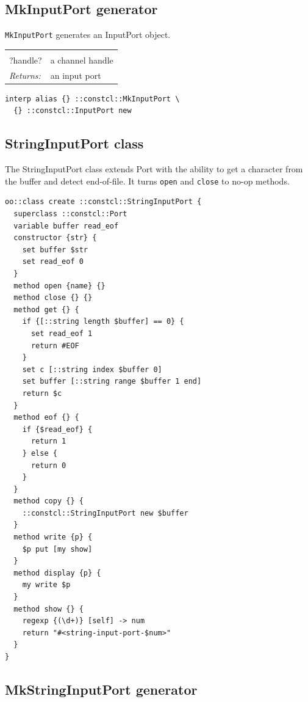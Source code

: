 \documentclass[twoside]{report}
\begin{document}
\subsection{MkInputPort generator}
\label{mkinputport-generator}

\texttt{MkInputPort} generates an InputPort object.

\noindent\begin{tabular}{ |p{1.9cm} p{8cm}| }
\hline
\rowcolor[HTML]{CCCCCC} \multicolumn{2}{|l|}{\bf MkInputPort (internal)} \\
?handle? & a channel handle \\
\textit{Returns:} & an input port \\
\hline
\end{tabular}

\begin{lstlisting}
interp alias {} ::constcl::MkInputPort \
  {} ::constcl::InputPort new
\end{lstlisting}

\subsection{StringInputPort class}
\label{stringinputport-class}

The StringInputPort class extends Port with the ability to get a character from the buffer and detect end-of-file. It turns \texttt{open} and \texttt{close} to no-op methods.

\begin{lstlisting}
oo::class create ::constcl::StringInputPort {
  superclass ::constcl::Port
  variable buffer read_eof
  constructor {str} {
    set buffer $str
    set read_eof 0
  }
  method open {name} {}
  method close {} {}
  method get {} {
    if {[::string length $buffer] == 0} {
      set read_eof 1
      return #EOF
    }
    set c [::string index $buffer 0]
    set buffer [::string range $buffer 1 end]
    return $c
  }
  method eof {} {
    if {$read_eof} {
      return 1
    } else {
      return 0
    }
  }
  method copy {} {
    ::constcl::StringInputPort new $buffer
  }
  method write {p} {
    $p put [my show]
  }
  method display {p} {
    my write $p
  }
  method show {} {
    regexp {(\d+)} [self] -> num
    return "#<string-input-port-$num>"
  }
}
\end{lstlisting}

\subsection{MkStringInputPort generator}
\label{mkstringinputport-generator}
\end{document}
